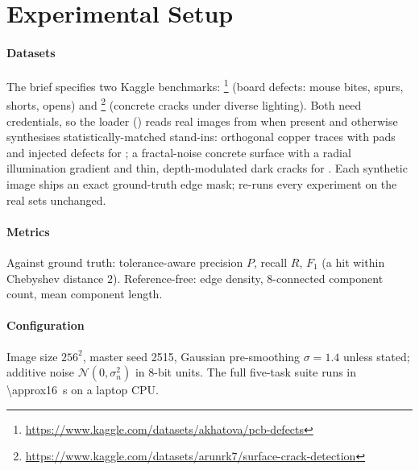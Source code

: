 \section{Experimental Setup}
\label{sec:setup}

\paragraph{Datasets}
The brief specifies two Kaggle benchmarks: \PCB{}%
\footnote{\url{https://www.kaggle.com/datasets/akhatova/pcb-defects}}
(board defects: mouse bites, spurs, shorts, opens) and \CRACK{}%
\footnote{\url{https://www.kaggle.com/datasets/arunrk7/surface-crack-detection}}
(concrete cracks under diverse lighting). Both need credentials, so the loader
() reads real images from 
when present and otherwise synthesises statistically-matched stand-ins:
orthogonal copper traces with pads and injected defects for \PCB{}; a
fractal-noise concrete surface with a radial illumination gradient and thin,
depth-modulated dark cracks for \CRACK{}. Each synthetic image ships an exact
ground-truth edge mask;  re-runs every experiment on the real
sets unchanged.

\paragraph{Metrics}
Against ground truth: tolerance-aware precision $P$, recall $R$, $F_1$ (a hit
within Chebyshev distance $2$). Reference-free: edge density, 8-connected
component count, mean component length.

\paragraph{Configuration}
Image size $256^2$, master seed \num{2515}, Gaussian pre-smoothing $\sigma=1.4$
unless stated; additive noise $\mathcal{N}(0,\sigma_n^2)$ in 8-bit units. The
full five-task suite runs in \SI{\approx16}{\second} on a laptop CPU.
